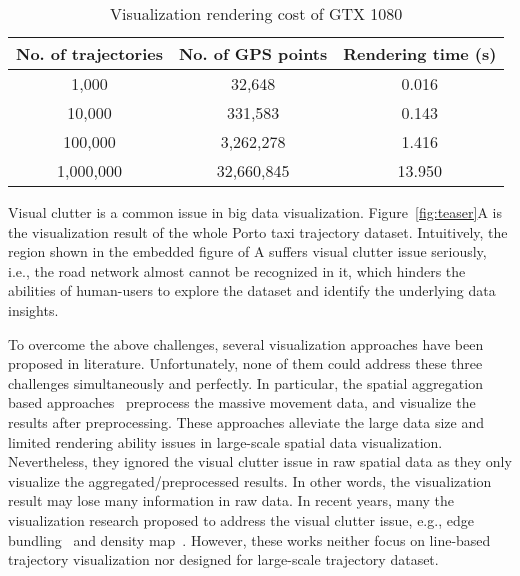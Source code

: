 \begin{table}
	\centering
    \small
	\caption{Visualization rendering cost of GTX 1080}
	\begin{tabular}{|c|c|c|} \hline
		No. of trajectories & No. of GPS points & Rendering time (s) \\ \hline
		1,000& 32,648 & 0.016\\ \hline
		10,000& 331,583 & 0.143\\ \hline
		100,000& 3,262,278 & 1.416\\ \hline
		1,000,000& 32,660,845 & 13.950\\
		\hline
	\end{tabular}
	\label{tab:gpu}
\end{table}

Visual clutter is a common issue in big data visualization.
Figure~\ref{fig:teaser}A is the visualization result of the whole Porto taxi trajectory dataset.
Intuitively, the region shown in the embedded figure of A suffers visual clutter issue seriously, 
i.e., the road network almost cannot be recognized in it,
which hinders the abilities of human-users to explore the dataset and identify the underlying data insights.



To overcome the above challenges, several visualization approaches have been proposed in literature.
Unfortunately, none of them could address these three challenges simultaneously and perfectly. 
In particular, the spatial aggregation based approaches~\cite{zeng2013visualizing,von2015mobilitygraphs} preprocess the massive movement data, and visualize the results after preprocessing. 
These approaches alleviate the large data size and limited rendering ability issues in large-scale spatial data visualization.
Nevertheless, they ignored the visual clutter issue in raw spatial data as they only visualize the aggregated/preprocessed results.
In other words, the visualization result may lose many information in raw data.
In recent years, many the visualization research proposed to address the visual clutter issue,
e.g., edge bundling~\cite{zeng2019route, thony2015vector} and density map~\cite{lampe2011interactive, scheepens2011interactive}. 
However, these works neither focus on line-based trajectory visualization nor designed for large-scale trajectory dataset.

